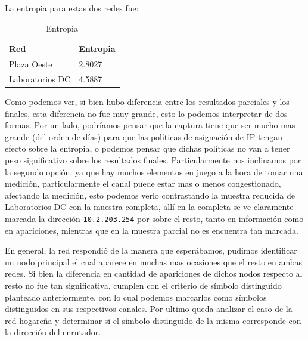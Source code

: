 

La entropia para estas dos redes fue:

\begin{table}[H]
\centering
\caption{Entropia}
\label{my-label}
\begin{tabular}{ll}
\hline
Red         & Entropia \\ \hline
Plaza Oeste & 2.8027   \\
Laboratorios DC    & 4.5887   \\ \hline
\end{tabular}
\end{table}

Como podemos ver, si bien hubo diferencia entre los resultados parciales y los finales, esta diferencia no fue muy grande, esto lo podemos interpretar de dos formas. Por un lado, podríamos pensar que la captura tiene que ser mucho mas grande (del orden de días) para que las políticas de asignación de IP tengan efecto sobre la entropia, o podemos pensar que dichas políticas no van a tener peso significativo sobre los resultados finales. Particularmente nos inclinamos por la segundo opción, ya que hay muchos elementos en juego a la hora de tomar una medición, particularmente el canal puede estar mas o menos congestionado, afectando la medición, esto podemos verlo contrastando la muestra reducida de Laboratorios DC con la muestra completa, allí en la completa se ve claramente marcada la dirección \texttt{10.2.203.254} por sobre el resto, tanto en información como en apariciones, mientras que en la muestra parcial no es encuentra tan marcada.

En general, la red respondió de la manera que esperábamos, pudimos identificar un nodo principal el cual aparece en muchas mas ocasiones que el resto en ambas redes. Si bien la diferencia en cantidad de apariciones de dichos nodos respecto al resto no fue tan significativa, cumplen con el criterio de símbolo distinguido planteado anteriormente, con lo cual podemos marcarlos como símbolos distinguidos en sus respectivos canales. Por ultimo queda analizar el caso de la red hogareña y determinar si el símbolo distinguido de la misma corresponde con la dirección del enrutador.

